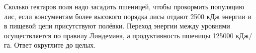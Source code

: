 
Сколько
гектаров поля надо засадить пшеницей, чтобы прокормить популяцию лис, если
консументам более высокого порядка лисы отдают 2500 кДж энергии и в пищевой
цепи присутствуют полёвки. Переход энергии между уровнями осуществляется по
правилу Линдемана, а продуктивность пшеницы 125000 кДж/га. Ответ округлите до
целых.

\explanationSection

